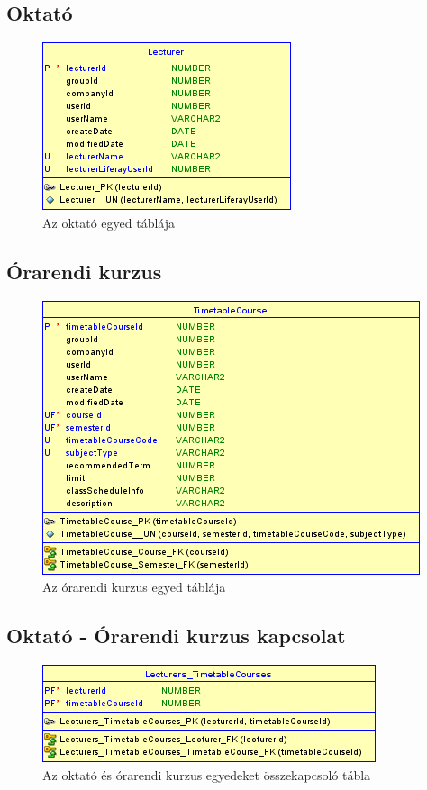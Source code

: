 \documentclass[hidelinks, 12pt, a4paper]{report}
\begin{document}
\subsection{Oktató}

\begin{figure}[H]
    \centering
	\includegraphics{lecturer.png}
	\caption{Az oktató egyed táblája}
\end{figure}

\subsection{Órarendi kurzus}

\begin{figure}[H]
    \centering
	\includegraphics{timetable_course.png}
	\caption{Az órarendi kurzus egyed táblája}
\end{figure}

\subsection{Oktató - Órarendi kurzus kapcsolat}

\begin{figure}[H]
    \centering
	\includegraphics{lecturer_timetable_course.png}
	\caption{Az oktató és órarendi kurzus egyedeket összekapcsoló tábla}
\end{figure}
\end{document}

